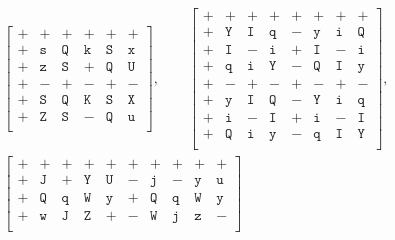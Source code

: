 \documentclass[12pt]{article}
\numberwithin{equation}{section}
\begin{document}
\begin{gather*}
\begin{bmatrix}
\texttt + &\texttt + &\texttt + &\texttt + &\texttt + &\texttt + \\
\texttt + &\texttt s &\texttt Q &\texttt k &\texttt S &\texttt x \\
\texttt + &\texttt z &\texttt S &\texttt + &\texttt Q &\texttt U \\
\texttt + &\texttt - &\texttt + &\texttt - &\texttt + &\texttt - \\
\texttt + &\texttt S &\texttt Q &\texttt K &\texttt S &\texttt X \\
\texttt + &\texttt Z &\texttt S &\texttt - &\texttt Q &\texttt u \\
\end{bmatrix},
\qquad
\begin{bmatrix}
\texttt + &\texttt + &\texttt + &\texttt + &\texttt + &\texttt + &\texttt + &\texttt +\\
\texttt + &\texttt Y &\texttt I &\texttt q &\texttt - &\texttt y &\texttt i &\texttt Q\\
\texttt + &\texttt I &\texttt - &\texttt i &\texttt + &\texttt I &\texttt - &\texttt i\\
\texttt + &\texttt q &\texttt i &\texttt Y &\texttt - &\texttt Q &\texttt I &\texttt y\\
\texttt + &\texttt - &\texttt + &\texttt - &\texttt + &\texttt - &\texttt + &\texttt -\\
\texttt + &\texttt y &\texttt I &\texttt Q &\texttt - &\texttt Y &\texttt i &\texttt q\\
\texttt + &\texttt i &\texttt - &\texttt I &\texttt + &\texttt i &\texttt - &\texttt I\\
\texttt + &\texttt Q &\texttt i &\texttt y &\texttt - &\texttt q &\texttt I &\texttt Y\\
\end{bmatrix},
\\
\begin{bmatrix}
\texttt+ &\texttt+ &\texttt+ &\texttt+ &\texttt+ &\texttt+ &\texttt+ &\texttt+ &\texttt+ &\texttt+ \\
\texttt+ &\texttt J &\texttt+ &\texttt Y &\texttt U &\texttt- &\texttt j &\texttt- &\texttt y &\texttt u \\
\texttt+ &\texttt Q &\texttt q &\texttt W &\texttt y &\texttt+ &\texttt Q &\texttt q &\texttt W &\texttt y \\
\texttt + &\texttt w &\texttt J &\texttt Z &\texttt + &\texttt - &\texttt W &\texttt j &\texttt z &\texttt - \\

\end{bmatrix}
\end{gather*}
\end{document}
